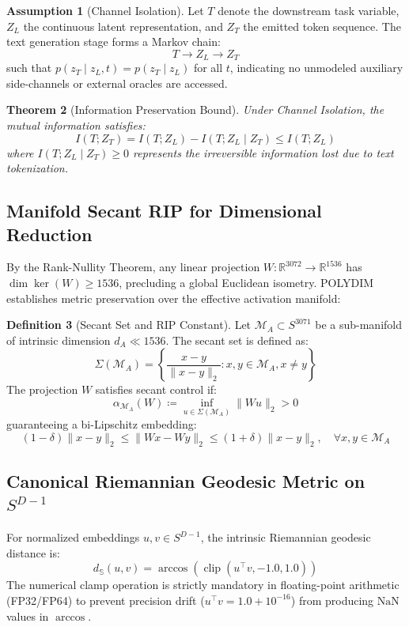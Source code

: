 \documentclass[11pt,twoside,a4paper]{article}
\theoremstyle{plain}
\newtheorem{theorem}{Theorem}[section]
\theoremstyle{definition}
\newtheorem{definition}[theorem]{Definition}
\newtheorem{assumption}[theorem]{Assumption}
\theoremstyle{remark}
\newcommand{\R}{\mathbb{R}}
\newcommand{\clip}{\operatorname{clip}}
\begin{document}
\begin{assumption}[Channel Isolation]
Let $T$ denote the downstream task variable, $Z_L$ the continuous latent representation, and $Z_T$ the emitted token sequence. The text generation stage forms a Markov chain:
$$T \longrightarrow Z_L \longrightarrow Z_T$$
such that $p(z_T \mid z_L, t) = p(z_T \mid z_L)$ for all $t$, indicating no unmodeled auxiliary side-channels or external oracles are accessed.
\end{assumption}

\begin{theorem}[Information Preservation Bound]
Under Channel Isolation, the mutual information satisfies:
$$I(T; Z_T) = I(T; Z_L) - I(T; Z_L \mid Z_T) \le I(T; Z_L)$$
where $I(T; Z_L \mid Z_T) \ge 0$ represents the irreversible information lost due to text tokenization.
\end{theorem}

\subsection{Manifold Secant RIP for Dimensional Reduction}

By the Rank-Nullity Theorem, any linear projection $W: \R^{3072} \to \R^{1536}$ has $\dim\ker(W) \ge 1536$, precluding a global Euclidean isometry. POLYDIM establishes metric preservation over the effective activation manifold:

\begin{definition}[Secant Set and RIP Constant]
Let $\mathcal{M}_A \subset S^{3071}$ be a sub-manifold of intrinsic dimension $d_A \ll 1536$. The secant set is defined as:
$$\Sigma(\mathcal{M}_A) = \left\{ \frac{x - y}{\|x - y\|_2} : x, y \in \mathcal{M}_A, x \ne y \right\}$$
The projection $W$ satisfies secant control if:
$$\alpha_{\mathcal{M}_A}(W) \coloneqq \inf_{u \in \Sigma(\mathcal{M}_A)} \|W u\|_2 > 0$$
guaranteeing a bi-Lipschitz embedding:
$$(1 - \delta)\|x - y\|_2 \le \|W x - W y\|_2 \le (1 + \delta)\|x - y\|_2, \quad \forall x, y \in \mathcal{M}_A$$
\end{definition}

\subsection{Canonical Riemannian Geodesic Metric on $S^{D-1}$}

For normalized embeddings $u, v \in S^{D-1}$, the intrinsic Riemannian geodesic distance is:
\begin{equation}
d_{\mathbb{S}}(u, v) = \arccos\left(\clip\left(u^\top v, -1.0, 1.0\right)\right)
\end{equation}
The numerical clamp operation is strictly mandatory in floating-point arithmetic (FP32/FP64) to prevent precision drift ($u^\top v = 1.0 + 10^{-16}$) from producing $\text{NaN}$ values in $\arccos$.
\end{document}
